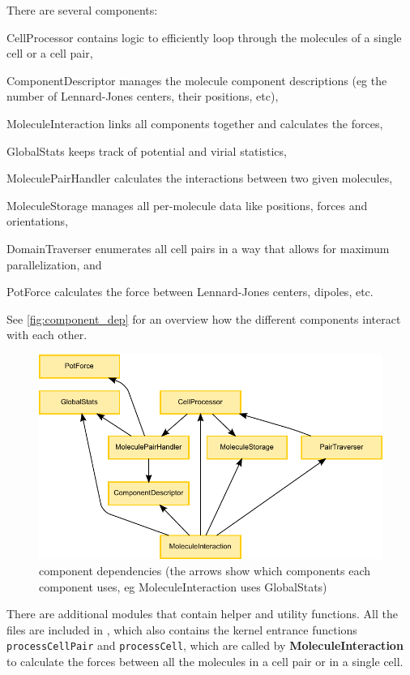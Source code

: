 There are several components:
\begin{compactdesc}
\item[CellProcessor] contains logic to efficiently loop through the molecules of a single cell or a cell pair,
\item[ComponentDescriptor] manages the molecule component descriptions (eg the number of Lennard-Jones centers, their positions, etc),
\item[MoleculeInteraction] links all components together and calculates the forces,
\item[GlobalStats] keeps track of potential and virial statistics,
\item[MoleculePairHandler] calculates the interactions between two given molecules,
\item[MoleculeStorage] manages all per-molecule data like positions, forces and orientations,
\item[DomainTraverser] enumerates all cell pairs in a way that allows for maximum parallelization, and
\item[PotForce] calculates the force between Lennard-Jones centers, dipoles, etc.
\end{compactdesc}
See \autoref{fig:component_dep} for an overview how the different components interact with each other.

\begin{figure}
\centering
\includegraphics{figures/component_dependencies.pdf}
\caption{component dependencies (the arrows show which components each component uses, eg MoleculeInteraction uses GlobalStats)}
\label{fig:component_dep}
\end{figure}

There are additional \cuda{} modules that contain helper and utility functions.
All the  files are included in , which also contains the kernel entrance functions \lstinline!processCellPair! and \lstinline!processCell!, which are called by \textbf{MoleculeInteraction} to calculate the forces between all the molecules in a cell pair or in a single cell.

